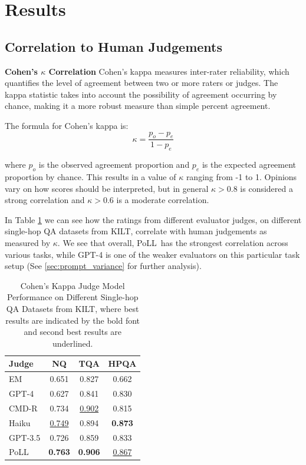 \documentclass[11pt]{article}
\newcommand{\acronym}{PoLL\ }
\begin{document}
\section{Results \label{sec:results}}

\subsection{Correlation to Human Judgements \label{sec:results_kappa}}
\noindent\textbf{Cohen's $\kappa$ Correlation}
Cohen's kappa measures inter-rater reliability, which quantifies the level of agreement between two or more raters or judges. The kappa statistic takes into account the possibility of agreement occurring by chance, making it a more robust measure than simple percent agreement.

The formula for Cohen's kappa is:
$$
\kappa = \frac{p_o - p_e}{1 - p_e}
$$

\noindent where $p_o$ is the observed agreement proportion and $p_e$ is the expected agreement proportion by chance. This results in a value of $\kappa$ ranging from -1 to 1. Opinions vary on how scores should be interpreted, but in general $\kappa > 0.8$ is considered a strong correlation and $\kappa > 0.6$ is a moderate correlation.

In Table \ref{tab:judge_model_performance} we can see how the ratings from different evaluator judges, on different single-hop QA datasets from KILT, correlate with human judgements as measured by $\kappa$. We see that overall, \acronym has the strongest correlation across various tasks, while GPT-4 is one of the weaker evaluators on this particular task setup (See \ref{sec:prompt_variance} for further analysis).

\begin{table}[ht]
\centering
\begin{tabular}{lccc}
\toprule
\textbf{Judge} & \textbf{NQ} & \textbf{TQA} & \textbf{HPQA} \\ \midrule
EM & 0.651 & 0.827 & 0.662 \\ 
GPT-4 & 0.627 & 0.841 & 0.830 \\ 
\midrule
CMD-R & 0.734 & \underline{0.902} & 0.815 \\ 
Haiku & \underline{0.749} & 0.894 & \textbf{0.873} \\ 
GPT-3.5 & 0.726 & 0.859 & 0.833 \\ 
\midrule
\acronym & \textbf{0.763} & \textbf{0.906} & \underline{0.867} \\
\bottomrule
\end{tabular}
\caption{Cohen's Kappa Judge Model Performance on Different Single-hop QA Datasets from KILT, where best results are indicated by the bold font and second best results are underlined.}
\label{tab:judge_model_performance}
\end{table}
\end{document}
